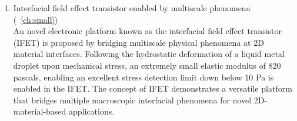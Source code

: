 \begin{enumerate}
\item Interfacial field effect transistor enabled by multiscale phenomena (~\autoref{ch:small})\\
  An novel electronic platform known as the interfacial field effect
  transistor (IFET) is proposed by bridging multiscale physical
  phenomena at 2D material interfaces. Following the hydrostatic
  deformation of a liquid metal droplet upon mechanical stress, an
  extremely small elastic modulus of 820 pascals, enabling an
  excellent stress detection limit down below 10 Pa is enabled in the
  IFET. The concept of IFET demonstrates a versatile platform that
  bridges multiple macroscopic interfacial phenomena for novel
  2D-material-based applications.
\end{enumerate}





